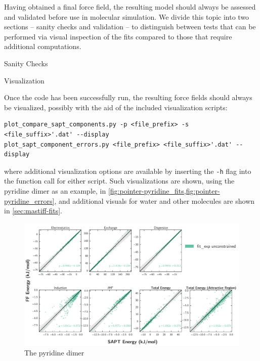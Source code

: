 Having obtained a final force field, the resulting model should always be
assessed and validated before use in molecular simulation. We divide this
topic into two sections -- sanity checks and validation -- to distinguish
between tests that can be performed via visual inspection of the fits compared
to those that require additional computations.

\begin{subsection}{Sanity Checks}

\begin{paragraph}{Visualization}

Once the \pointer code has been successfully run, the resulting force fields
should always be visualized, possibly with the aid of the included
visualization scripts:

\begin{lstlisting}
plot_compare_sapt_components.py -p <file_prefix> -s <file_suffix>'.dat' --display
plot_sapt_component_errors.py <file_prefix> <file_suffix>'.dat' --display
\end{lstlisting}

where additional visualization options are available by inserting the \verb|-h|
flag into the function call for either script. Such visualizations are shown,
using the pyridine dimer as an example, in
\cref{fig:pointer-pyridine_fits,fig:pointer-pyridine_errors}, and additional
visuals for water and other molecules are shown in \cref{sec:mastiff-fits}.

\begin{figure}
\centering
\includegraphics[width=\textwidth]{pointer/pyridine/sapt_comparison.pdf}
\caption[Comparison with the pyridine dimer]
{The pyridine dimer}
\label{fig:pointer-pyridine_fits}
\end{figure}


\end{paragraph}
\end{subsection}
